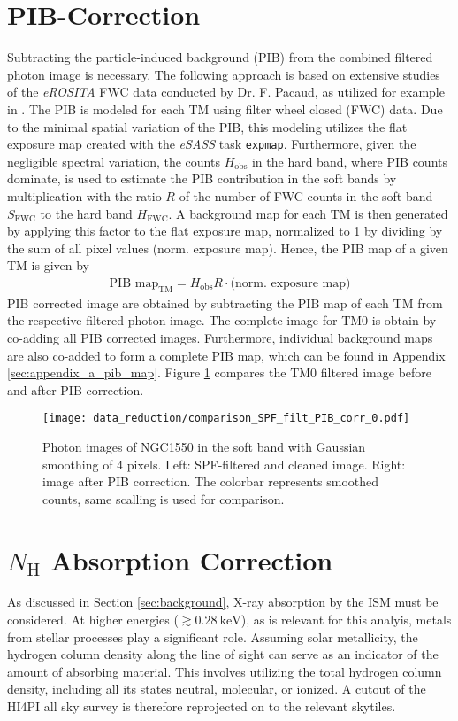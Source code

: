 \section{PIB-Correction}
Subtracting the particle-induced background (PIB) from the combined filtered photon image is necessary. The following  approach is based on extensive studies of the \textit{eROSITA} FWC data conducted by Dr. F. Pacaud, as utilized for example in \cite{Reiprich2021}.  The PIB is modeled for each TM using filter wheel closed (FWC) data. Due to the minimal spatial variation of the PIB, this modeling utilizes the flat exposure map created with the \textit{eSASS} task \texttt{expmap}. Furthermore, given the negligible spectral variation, the counts \(H_\text{obs}\) in the hard band, where PIB counts dominate, is used to estimate the PIB contribution in the soft bands by multiplication with the ratio \(R\) of the number of FWC counts in the soft band \(S_{\text{FWC}}\) to the hard band \(H_\text{FWC}\). A background map for each TM is then generated by applying this factor to the flat exposure map, normalized to 1 by dividing by the sum of all pixel values (norm. exposure map). Hence, the PIB map of a given TM is given by
\begin{align*}
    \text{PIB map}_\text{TM} = H_\text{obs}R\cdot\bigl(\text{norm. exposure map}\bigr)
\end{align*}
PIB corrected image are obtained by subtracting the PIB map of each TM from the respective filtered photon image. The complete image for TM0 is obtain by co-adding all PIB corrected images. Furthermore, individual background maps are also co-added to form a complete PIB map, which can be found in Appendix \ref{sec:appendix_a_pib_map}. Figure \ref{fig:comparison_of_spf_and_filtered} compares the TM0 filtered image before and after PIB correction.
\begin{figure}[htbp]
    \centering
    \texttt{[image: data\_reduction/comparison\_SPF\_filt\_PIB\_corr\_0.pdf]}
    \caption{Photon images of NGC1550 in the soft band with Gaussian smoothing of \(4\) pixels. Left: SPF-filtered and cleaned image. Right: image after PIB correction. The colorbar represents smoothed counts, same scalling is used for comparison.}
    \label{fig:comparison_of_spf_and_filtered}
\end{figure}
\section{\(N_\text{H}\) Absorption Correction}
As discussed in Section \ref{sec:background}, X-ray absorption by the ISM must be considered. At higher energies (\(\gtrsim \SI{0.28}{\kilo\electronvolt}\)), as is relevant for this analyis, metals from stellar processes play a significant role. Assuming solar metallicity, the hydrogen column density along the line of sight can serve as an indicator of the amount of absorbing material. This involves utilizing the total hydrogen column density, including all its states neutral, molecular, or ionized. A cutout of the HI4PI all sky survey is therefore reprojected on to the relevant skytiles.  







